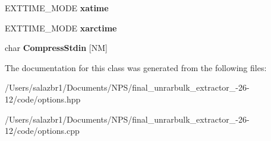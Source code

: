 \begin{DoxyCompactItemize}
\item 
\hypertarget{class_r_a_r_options_a9c060d821fb807b485a89eec13262491}{E\-X\-T\-T\-I\-M\-E\-\_\-\-M\-O\-D\-E {\bfseries xatime}}\label{class_r_a_r_options_a9c060d821fb807b485a89eec13262491}

\item 
\hypertarget{class_r_a_r_options_a27eb05a796e2b9e116cfed595506774d}{E\-X\-T\-T\-I\-M\-E\-\_\-\-M\-O\-D\-E {\bfseries xarctime}}\label{class_r_a_r_options_a27eb05a796e2b9e116cfed595506774d}

\item 
\hypertarget{class_r_a_r_options_a864f7f7e237f708294361ed156763bf8}{char {\bfseries Compress\-Stdin} \mbox{[}N\-M\mbox{]}}\label{class_r_a_r_options_a864f7f7e237f708294361ed156763bf8}

\end{DoxyCompactItemize}


The documentation for this class was generated from the following files\-:\begin{DoxyCompactItemize}
\item 
/\-Users/salazbr1/\-Documents/\-N\-P\-S/final\-\_\-unrarbulk\-\_\-extractor\-\_-\/26-\/12/code/options.\-hpp\item 
/\-Users/salazbr1/\-Documents/\-N\-P\-S/final\-\_\-unrarbulk\-\_\-extractor\-\_-\/26-\/12/code/options.\-cpp\end{DoxyCompactItemize}
